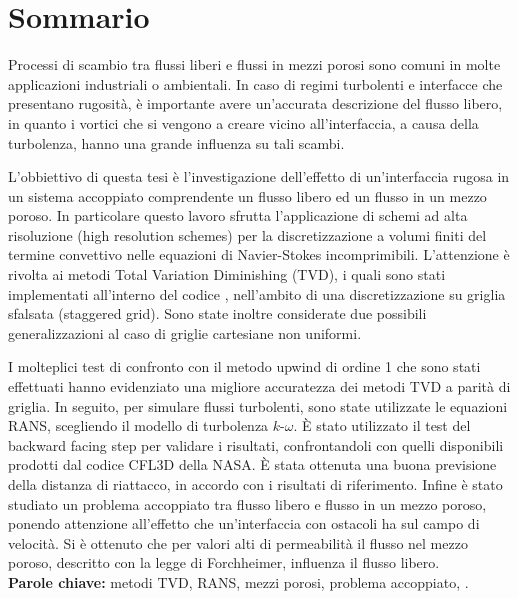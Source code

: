 \chapter*{Sommario}
Processi di scambio tra flussi liberi e flussi in mezzi porosi sono comuni in 
molte applicazioni industriali o ambientali. In caso di regimi turbolenti e 
interfacce che presentano rugosità, è importante avere un'accurata 
descrizione del flusso libero, in quanto i vortici che si vengono a creare 
vicino all'interfaccia, a causa della turbolenza, hanno una grande influenza 
su tali scambi.

L'obbiettivo di questa tesi è l'investigazione dell'effetto di un'interfaccia 
rugosa in un sistema accoppiato comprendente un flusso libero ed un flusso in 
un mezzo poroso. In particolare questo lavoro sfrutta l'applicazione di schemi 
ad alta 
risoluzione (high resolution schemes) per la discretizzazione a volumi finiti 
del termine convettivo nelle equazioni di Navier-Stokes incomprimibili. L'attenzione è rivolta ai metodi Total Variation Diminishing (TVD), i quali sono stati implementati all'interno del codice \DUMUX, nell'ambito di una 
discretizzazione su griglia sfalsata (staggered grid). Sono state inoltre 
considerate due possibili generalizzazioni al caso di griglie cartesiane non 
uniformi.

I molteplici test di confronto con il metodo upwind di ordine 1 che sono stati 
effettuati hanno evidenziato una migliore accuratezza dei metodi TVD a parità 
di griglia. 
In seguito, per simulare flussi turbolenti, sono state utilizzate le equazioni 
RANS, scegliendo il modello di turbolenza $k\text{-}\omega$. È stato 
utilizzato il test del backward facing step per validare i risultati, 
confrontandoli con quelli disponibili prodotti dal codice CFL3D della NASA. È 
stata ottenuta una buona previsione della distanza di riattacco, in accordo con 
i risultati di riferimento. Infine è stato studiato un problema accoppiato tra 
flusso libero e flusso in un mezzo poroso, ponendo attenzione all'effetto che 
un'interfaccia con ostacoli ha sul campo di velocità. Si è ottenuto 
che per valori alti di permeabilità il flusso nel mezzo poroso, descritto con 
la legge di Forchheimer, influenza il flusso libero.
\\[\baselineskip]
\textbf{Parole chiave:} metodi TVD, RANS, mezzi porosi, problema accoppiato, 
\DUMUX.

